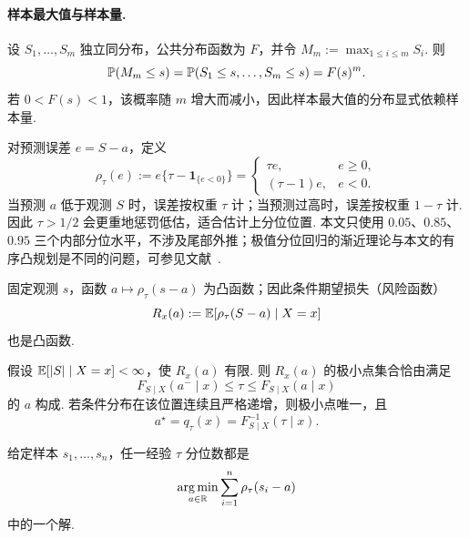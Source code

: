 \paragraph{样本最大值与样本量. \quad}
设 $S_1,\ldots,S_m$ 独立同分布，公共分布函数为 $F$，并令
$M_m:=\max_{1\le i\le m}S_i$. 则
\begin{equation}\label{eq:bg-sample-maximum}
\mathbb P(M_m\le s)
=\mathbb P(S_1\le s,\ldots,S_m\le s)
=F(s)^m.
\end{equation}
若 $0<F(s)<1$，该概率随 $m$ 增大而减小，因此样本最大值的分布显式依赖样本量. 


\begin{definition}[Pinball 损失]\label{def:bg-pinball}
对预测误差 $e=S-a$，定义
\begin{equation}\label{eq:q4-pinball-v13}
\rho_\tau(e)
:=e\{\tau-\mathbf 1_{\{e<0\}}\}
=\begin{cases}
\tau e,&e\ge0,\\
(\tau-1)e,&e<0.
\end{cases}
\end{equation}
当预测 $a$ 低于观测 $S$ 时，误差按权重 $\tau$ 计；当预测过高时，误差按权重 $1-\tau$ 计. 因此 $\tau>1/2$ 会更重地惩罚低估，适合估计上分位位置\cite{koenker,koenker_bassett,koenker_hallock}. 本文只使用 $0.05$、$0.85$、$0.95$ 三个内部分位水平，不涉及尾部外推；极值分位回归的渐近理论与本文的有序凸规划是不同的问题，可参见文献~\cite{chernozhukov_extreme}. 
\end{definition}

\begin{lemma}\label{lem:bg-pinball-convex}
固定观测 $s$，函数 $a\mapsto\rho_\tau(s-a)$ 为凸函数；因此条件期望损失（风险函数）
\[
R_x(a):=\mathbb E[\rho_\tau(S-a)\mid X=x]
\]
也是凸函数. 
\end{lemma}

\begin{proposition}\label{thm:bg-pinball-quantile}
假设 $\mathbb E[|S|\mid X=x]<\infty$，使 $R_x(a)$ 有限. 则 $R_x(a)$ 的极小点集合恰由满足
\begin{equation}\label{eq:q4-quantile-subgradient-v13}
F_{S\mid X}(a^-\mid x)\le\tau\le F_{S\mid X}(a\mid x)
\end{equation}
的 $a$ 构成. 若条件分布在该位置连续且严格递增，则极小点唯一，且
\[
a^\star=q_\tau(x)=F^{-1}_{S\mid X}(\tau\mid x).
\]
\end{proposition}

\begin{corollary}\label{cor:bg-empirical-quantile}
给定样本 $s_1,\ldots,s_n$，任一经验 $\tau$ 分位数都是
\[
\operatorname*{arg\,min}_{a\in\mathbb R}\sum_{i=1}^{n}\rho_\tau(s_i-a)
\]
中的一个解. 
\end{corollary}

